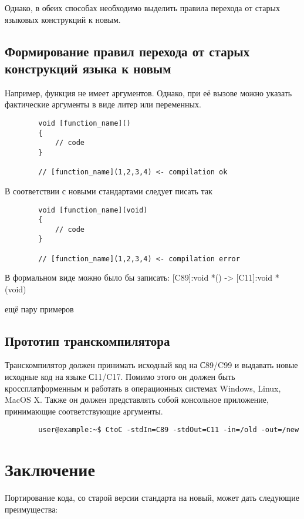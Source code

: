 \documentclass{article}
\begin{document}
	Однако, в обеих способах необходимо выделить правила перехода от старых языковых конструкций к новым.

	\subsection{Формирование правил перехода от старых конструкций языка к новым}

	Например, функция не имеет аргументов. Однако, при её вызове можно указать фактические аргументы в виде литер или переменных.

	\begin{verbatim}
		void [function_name]()
		{
			// code
		}

		// [function_name](1,2,3,4) <- compilation ok
	\end{verbatim}

	В соответствии с новыми стандартами следует писать так

	\begin{verbatim}
		void [function_name](void)
		{
			// code
		}

		// [function_name](1,2,3,4) <- compilation error
	\end{verbatim}

	В формальном виде можно было бы записать: [C89]:void *() -> [C11]:void *(void)

	ещё пару примеров


	\subsection{Прототип транскомпилятора}

	Транскомпилятор должен принимать исходный код на С89/C99 и выдавать новые исходные код на языке С11/C17. Помимо этого он должен быть кроссплатформенным и работать в операционных системах Windows, Linux, MacOS X. Также он должен представлять собой консольное приложение, принимающие соответствующие аргументы.
	
	\begin{verbatim}
		user@example:~$ CtoC -stdIn=C89 -stdOut=C11 -in=/old -out=/new
	\end{verbatim}


	\section{Заключение}

	Портирование кода, со старой версии стандарта на новый, может дать следующие преимущества:
\end{document}
